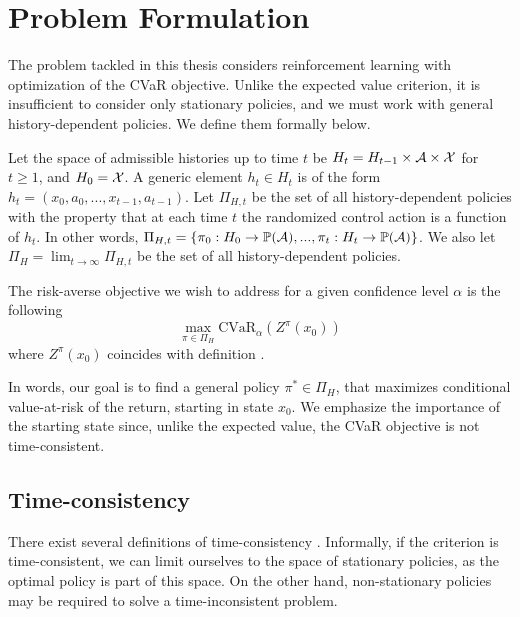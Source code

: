 
\section{Problem Formulation}\label{sec:prelim:problem}

The problem tackled in this thesis considers reinforcement learning with optimization of the CVaR objective. Unlike the expected value criterion, it is insufficient to consider only stationary policies, and we must work with general history-dependent policies. We define them formally below.

\begin{definition}
Let the space of admissible histories up to time $t$ be $H_t = H_{t-1} \times \mathcal{A} \times \mathcal{X}$ for $t \ge 1$, and $H_0 = \mathcal{X}$. A generic element $h_t \in H_t$ is of the form $h_t = (x_0, a_0, ..., x_{t-1}, a_{t-1})$. Let $\Pi_{H,t}$ be the set of all history-dependent policies with the property that at each time $t$ the randomized control action is a function of $h_t$. In other words, 
$\Pi_{H,t} = \left\{ {\pi_0: H_0 \to \mathbb{P}(\mathcal{A}), ..., \pi_t: H_t \to \mathbb{P}(\mathcal{A})} \right\}$. We also let $\Pi_H = \lim_{t\to\infty}\Pi_{H,t}$ be the set of all history-dependent policies.
\end{definition}

The risk-averse objective we wish to address for a given confidence level $\alpha$ is the following
\begin{equation}\label{eqn:problem}
\max_{\pi \in \Pi_H} \text{CVaR}_\alpha(Z^\pi(x_0))
\end{equation}
where $Z^\pi(x_0)$ coincides with definition .

In words, our goal is to find a general policy $\pi^*\in \Pi_H$, that maximizes conditional value-at-risk of the return, starting in state $x_0$. We emphasize the importance of the starting state since, unlike the expected value, the CVaR objective is not time-consistent.


\subsection{Time-consistency}

There exist several definitions of time-consistency \citep{pflug2016time, boda2006time}.
Informally, if the criterion is time-consistent, we can limit ourselves to the space of stationary policies, as the optimal policy is part of this space. On the other hand, non-stationary policies may be required to solve a time-inconsistent problem.

